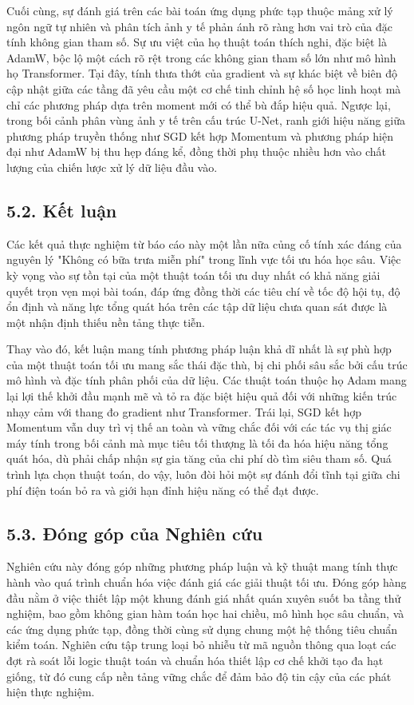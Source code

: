 \documentclass[a4paper,12pt]{article}
\begin{document}
Cuối cùng, sự đánh giá trên các bài toán ứng dụng phức tạp thuộc mảng xử lý ngôn ngữ tự nhiên và phân tích ảnh y tế phản ánh rõ ràng hơn vai trò của đặc tính không gian tham số. Sự ưu việt của họ thuật toán thích nghi, đặc biệt là AdamW, bộc lộ một cách rõ rệt trong các không gian tham số lớn như mô hình họ Transformer. Tại đây, tính thưa thớt của gradient và sự khác biệt về biên độ cập nhật giữa các tầng đã yêu cầu một cơ chế tinh chỉnh hệ số học linh hoạt mà chỉ các phương pháp dựa trên moment mới có thể bù đắp hiệu quả. Ngược lại, trong bối cảnh phân vùng ảnh y tế trên cấu trúc U-Net, ranh giới hiệu năng giữa phương pháp truyền thống như SGD kết hợp Momentum và phương pháp hiện đại như AdamW bị thu hẹp đáng kể, đồng thời phụ thuộc nhiều hơn vào chất lượng của chiến lược xử lý dữ liệu đầu vào.

\subsection{5.2. Kết luận}

Các kết quả thực nghiệm từ báo cáo này một lần nữa củng cố tính xác đáng của nguyên lý "Không có bữa trưa miễn phí" trong lĩnh vực tối ưu hóa học sâu. Việc kỳ vọng vào sự tồn tại của một thuật toán tối ưu duy nhất có khả năng giải quyết trọn vẹn mọi bài toán, đáp ứng đồng thời các tiêu chí về tốc độ hội tụ, độ ổn định và năng lực tổng quát hóa trên các tập dữ liệu chưa quan sát được là một nhận định thiếu nền tảng thực tiễn.

Thay vào đó, kết luận mang tính phương pháp luận khả dĩ nhất là sự phù hợp của một thuật toán tối ưu mang sắc thái đặc thù, bị chi phối sâu sắc bởi cấu trúc mô hình và đặc tính phân phối của dữ liệu. Các thuật toán thuộc họ Adam mang lại lợi thế khởi đầu mạnh mẽ và tỏ ra đặc biệt hiệu quả đối với những kiến trúc nhạy cảm với thang đo gradient như Transformer. Trái lại, SGD kết hợp Momentum vẫn duy trì vị thế an toàn và vững chắc đối với các tác vụ thị giác máy tính trong bối cảnh mà mục tiêu tối thượng là tối đa hóa hiệu năng tổng quát hóa, dù phải chấp nhận sự gia tăng của chi phí dò tìm siêu tham số. Quá trình lựa chọn thuật toán, do vậy, luôn đòi hỏi một sự đánh đổi tĩnh tại giữa chi phí điện toán bỏ ra và giới hạn đỉnh hiệu năng có thể đạt được.

\subsection{5.3. Đóng góp của Nghiên cứu}

Nghiên cứu này đóng góp những phương pháp luận và kỹ thuật mang tính thực hành vào quá trình chuẩn hóa việc đánh giá các giải thuật tối ưu. Đóng góp hàng đầu nằm ở việc thiết lập một khung đánh giá nhất quán xuyên suốt ba tầng thử nghiệm, bao gồm không gian hàm toán học hai chiều, mô hình học sâu chuẩn, và các ứng dụng phức tạp, đồng thời cùng sử dụng chung một hệ thống tiêu chuẩn kiểm toán. Nghiên cứu tập trung loại bỏ nhiễu từ mã nguồn thông qua loạt các đợt rà soát lỗi logic thuật toán và chuẩn hóa thiết lập cơ chế khởi tạo đa hạt giống, từ đó cung cấp nền tảng vững chắc để đảm bảo độ tin cậy của các phát hiện thực nghiệm.
\end{document}
